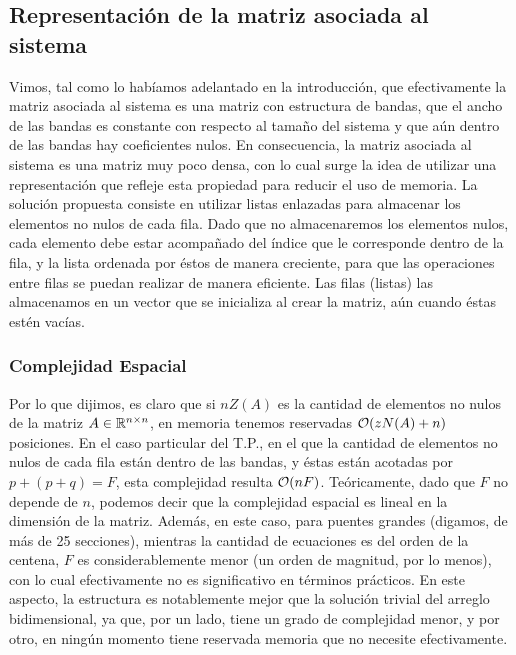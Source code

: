 	\subsection{Representación de la matriz asociada al sistema}
Vimos, tal como lo habíamos adelantado en la introducción, que efectivamente la matriz asociada al sistema es una matriz con estructura de bandas, que el ancho de las bandas es constante con respecto al tamaño del sistema y que aún dentro de las bandas hay coeficientes nulos. En consecuencia, la matriz asociada al sistema es una matriz muy poco densa, con lo cual surge la idea de utilizar una representación que refleje esta propiedad para reducir el uso de memoria. La solución propuesta consiste en utilizar listas enlazadas para almacenar los elementos no nulos de cada fila. Dado que no almacenaremos los elementos nulos, cada elemento debe estar acompañado del índice que le corresponde dentro de la fila, y la lista ordenada por éstos de manera creciente, para que las operaciones entre filas se puedan realizar de manera eficiente. Las filas (listas) las almacenamos en un vector que se inicializa al crear la matriz, aún cuando éstas estén vacías. 

\subsubsection{Complejidad Espacial}
Por lo que dijimos, es claro que si $nZ(A)$ es la cantidad de elementos no nulos de la matriz $A \in \mathbb{R}^{n\times n}$, en memoria tenemos reservadas $\mathcal{O}(zN(A) + n)$ posiciones. En el caso particular del T.P., en el que la cantidad de elementos no nulos de cada fila están dentro de las bandas, y éstas están acotadas por $p+ (p+q) = F$, esta complejidad resulta $\mathcal{O}(nF)$. Teóricamente, dado que $F$ no depende de $n$, podemos decir que la complejidad espacial es lineal en la dimensión de la matriz. Además, en este caso, para puentes grandes (digamos, de más de 25 secciones), mientras la cantidad de ecuaciones es del orden de la centena, $F$ es considerablemente menor (un orden de magnitud, por lo menos), con lo cual efectivamente no es significativo en términos prácticos. En este aspecto, la estructura es notablemente mejor que la solución trivial del arreglo bidimensional, ya que, por un lado, tiene un grado de complejidad menor, y por otro, en ningún momento tiene reservada memoria que no necesite efectivamente.

